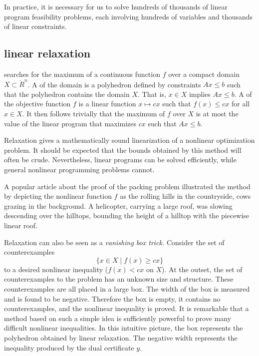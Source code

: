 In practice, it is necessary for us to solve hundreds of thousands of
linear program feasibility problems, each involving
hundreds of variables and thousands of linear constraints.

\subsection{linear relaxation}

 searches for the maximum of a
continuous function $f$ over a compact domain $X\subset \ring{R}^n$.
A  of the domain is a polyhedron defined by
constraints $A x \le b$ such that the polyhedron contains the domain
$X$.  That is, $x\in X$ implies $A x \le b$.  A  of the objective function $f$ is a linear function
$x\mapsto c x$ such that $f(x) \le c x$ for all $x\in X$.  It then
follows trivially that the maximum of $f$ over $X$ is at most the
value of the linear program that maximizes $c x$ such that $A x \le
b$.

Relaxation gives a mathematically sound linearization of a
nonlinear optimization problem.  It should be expected that the bounds
obtained by this method will often be crude.  Nevertheless, linear
programs can be solved efficiently, while general nonlinear
programming problems cannot.

\begin{remark}[popularization]
A popular article about the proof of the packing problem
illustrated the method by depicting the nonlinear function $f$
as the rolling hills in the countryside, cows grazing in the background.  
A helicopter,
carrying a large roof, was slowing
descending over the hilltops, bounding the height of a hilltop
with the piecewise linear roof.
\end{remark}

\begin{remark}
Relaxation can also be seen as a {\it vanishing
box trick.}  Consider the set of counterexamples
\[
\{x\in X\mid f(x)\ge c x\}
\]
to a desired nonlinear inequality ($f(x)< c x$ on $X$).  At the outset, the set
of counterexamples to the problem has an unknown size and structure.
These counterexamples are all placed in a large box.  The width of the
box is measured and is found to be negative.  Therefore the box is
empty, it contains no counterexamples, and the nonlinear inequality is
proved.   It is remarkable that a method based
on such a simple idea is sufficiently powerful to prove many difficult nonlinear
inequalities.  In this intuitive picture, the box represents the polyhedron obtained
by linear relaxation.  The negative width represents the inequality
produced by the dual certificate $y$. 
\end{remark}

